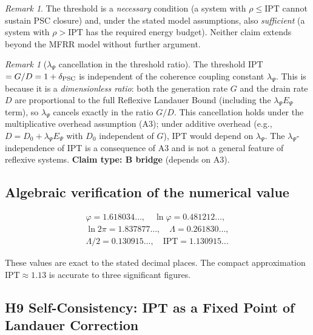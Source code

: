 \documentclass[11pt,twocolumn]{article}
\newcommand{\CatB}{\textbf{B}}
\theoremstyle{remark}
\newtheorem{remark}[theorem]{Remark}
\begin{document}
\begin{remark}
The threshold is a \emph{necessary} condition (a system with $\rho \leq
\mathrm{IPT}$ cannot sustain PSC closure) and, under the stated model
assumptions, also \emph{sufficient} (a system with $\rho > \mathrm{IPT}$
has the required energy budget). Neither claim extends beyond the MFRR
model without further argument.
\end{remark}

\begin{remark}[$\lambda_\Psi$ cancellation in the threshold ratio]
\label{rem:lambda-cancel}
The threshold IPT $= G/D = 1 + \delta_{\rm PSC}$ is independent of the coherence coupling constant $\lambda_\Psi$. This is because it is a \emph{dimensionless ratio}: both the generation rate $G$ and the drain rate $D$ are proportional to the full Reflexive Landauer Bound (including the $\lambda_\Psi E_\Psi$ term), so $\lambda_\Psi$ cancels exactly in the ratio $G/D$. This cancellation holds under the multiplicative overhead assumption (A3); under additive overhead (e.g., $D = D_0 + \lambda_\Psi E_\Psi$ with $D_0$ independent of $G$), IPT would depend on $\lambda_\Psi$. The $\lambda_\Psi$-independence of IPT is a consequence of A3 and is not a general feature of reflexive systems. \textbf{Claim type: $\CatB$ bridge} (depends on A3).
\end{remark}

\subsection{Algebraic verification of the numerical value}
\label{sec:deriv:numerics}

\begin{gather*}
\varphi = 1.618034\ldots, \quad
\ln\varphi = 0.481212\ldots,\\
\ln 2\pi = 1.837877\ldots, \quad
\Lambda = 0.261830\ldots,\\
\Lambda/2 = 0.130915\ldots, \quad
\mathrm{IPT} = 1.130915\ldots
\end{gather*}

These values are exact to the stated decimal places. The compact
approximation $\mathrm{IPT} \approx 1.13$ is accurate to three
significant figures.

\subsection{H9 Self-Consistency: IPT as a Fixed Point of Landauer Correction}
\label{sec:ipt_self_consistency}
\end{document}
